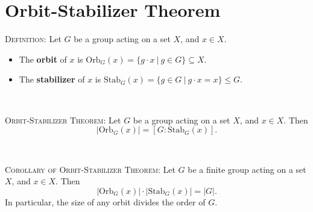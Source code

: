 \documentclass[12pt]{amsart}
\newcommand{\showsol}[1]{\def\displaysol{#1}}
\begin{document}
\showsol{0}
	
	\thispagestyle{empty}
	
	\section*{Orbit-Stabilizer Theorem}
	
	

\begin{framed}
\textsc{Definition:} Let $G$ be a group acting on a set $X$, and $x\in X$.
\begin{itemize}
\item The \textbf{orbit} of $x$ is $\mathrm{Orb}_G(x) = \{ g\cdot x  \ | \ g\in G\} \subseteq X$.
\item The \textbf{stabilizer} of $x$ is $\mathrm{Stab}_G(x) = \{ g\in G \ | \ g \cdot x = x\} \leq G$.
\end{itemize}

\

\textsc{Orbit-Stabilizer Theorem:} Let $G$ be a group acting on a set $X$, and $x\in X$. Then
\[ | \mathrm{Orb}_G(x) | = [ G : \mathrm{Stab}_G(x) ].\]

\

\textsc{Corollary of Orbit-Stabilizer Theorem:} Let $G$ be a finite group acting on a set $X$, and $x\in X$. Then
\[  | \mathrm{Orb}_G(x) | \cdot |  \mathrm{Stab}_G(x) | = | G |.\]
In particular, the size of any orbit divides the order of $G$.
\end{framed}

\
\end{document}
